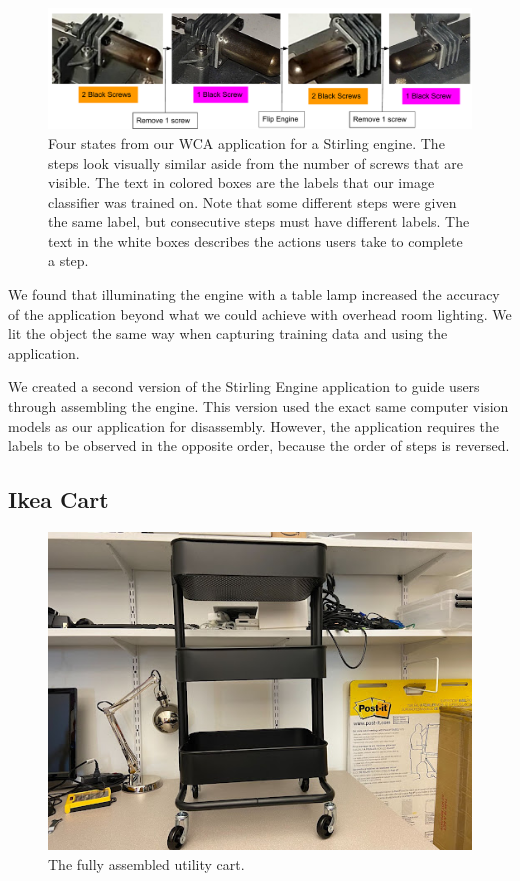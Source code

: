 \begin{figure}
  \includegraphics[width=\columnwidth]{figures/stirling_steps.pdf}
  \caption{Four states from our WCA application for a Stirling engine. The
    steps look visually similar aside from the number of screws that are
    visible. The text in colored boxes are the labels that our image classifier
    was trained on.
    Note that some different steps were given the same label, but consecutive
    steps must have different labels.
    The text in the white boxes describes the actions users take to complete a
    step.
  }\label{fig:stirling_steps}
  \vspace{0.5in}
\end{figure}

We found that illuminating the engine with a table lamp increased the accuracy
of the application beyond what we could achieve with overhead room lighting.
We lit the object the same way when capturing training data and using the
application.

We created a second version of the Stirling Engine application to guide users
through assembling the engine.
This version used the exact same computer vision models as our application for
disassembly.
However, the application requires the labels to be observed in the opposite
order, because the order of steps is reversed.

\subsection{Ikea Cart}\label{sec:ikea_cart}

\begin{figure}
  \includegraphics[width=\textwidth]{figures/full_cart.jpg}
  \caption{
    The fully assembled utility cart.
  }\label{fig:full_cart}
\end{figure}

